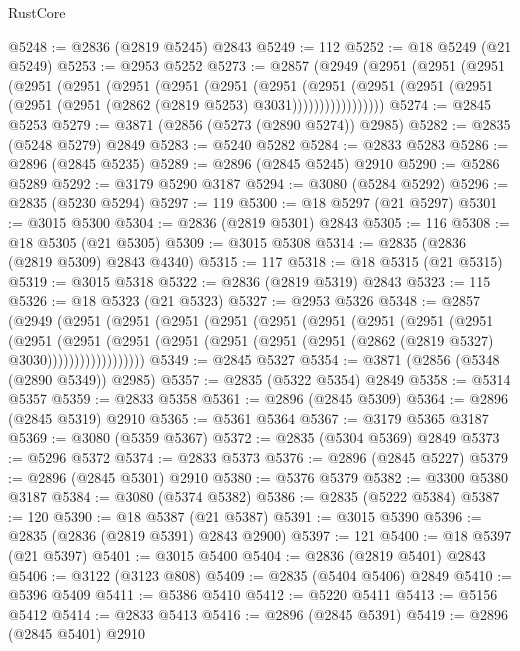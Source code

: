 \begin{lexlean}{RustCore}
\begin{coremodule}
@5248 := @2836 (@2819 @5245) @2843
@5249 := 112
@5252 := @18 @5249 (@21 @5249)
@5253 := @2953 @5252
@5273 := @2857
    (@2949
      (@2951
        (@2951
          (@2951
            (@2951
              (@2951
                (@2951
                  (@2951
                    (@2951
                      (@2951
                        (@2951
                          (@2951
                            (@2951 (@2951 (@2951 (@2951 (@2862 (@2819 @5253) @3031)))))))))))))))))
@5274 := @2845 @5253
@5279 := @3871 (@2856 (@5273 (@2890 @5274)) @2985)
@5282 := @2835 (@5248 @5279) @2849
@5283 := @5240 @5282
@5284 := @2833 @5283
@5286 := @2896 (@2845 @5235)
@5289 := @2896 (@2845 @5245) @2910
@5290 := @5286 @5289
@5292 := @3179 @5290 @3187
@5294 := @3080 (@5284 @5292)
@5296 := @2835 (@5230 @5294)
@5297 := 119
@5300 := @18 @5297 (@21 @5297)
@5301 := @3015 @5300
@5304 := @2836 (@2819 @5301) @2843
@5305 := 116
@5308 := @18 @5305 (@21 @5305)
@5309 := @3015 @5308
@5314 := @2835 (@2836 (@2819 @5309) @2843 @4340)
@5315 := 117
@5318 := @18 @5315 (@21 @5315)
@5319 := @3015 @5318
@5322 := @2836 (@2819 @5319) @2843
@5323 := 115
@5326 := @18 @5323 (@21 @5323)
@5327 := @2953 @5326
@5348 := @2857
    (@2949
      (@2951
        (@2951
          (@2951
            (@2951
              (@2951
                (@2951
                  (@2951
                    (@2951
                      (@2951
                        (@2951
                          (@2951
                            (@2951
                              (@2951
                                (@2951 (@2951 (@2951 (@2862 (@2819 @5327) @3030))))))))))))))))))
@5349 := @2845 @5327
@5354 := @3871 (@2856 (@5348 (@2890 @5349)) @2985)
@5357 := @2835 (@5322 @5354) @2849
@5358 := @5314 @5357
@5359 := @2833 @5358
@5361 := @2896 (@2845 @5309)
@5364 := @2896 (@2845 @5319) @2910
@5365 := @5361 @5364
@5367 := @3179 @5365 @3187
@5369 := @3080 (@5359 @5367)
@5372 := @2835 (@5304 @5369) @2849
@5373 := @5296 @5372
@5374 := @2833 @5373
@5376 := @2896 (@2845 @5227)
@5379 := @2896 (@2845 @5301) @2910
@5380 := @5376 @5379
@5382 := @3300 @5380 @3187
@5384 := @3080 (@5374 @5382)
@5386 := @2835 (@5222 @5384)
@5387 := 120
@5390 := @18 @5387 (@21 @5387)
@5391 := @3015 @5390
@5396 := @2835 (@2836 (@2819 @5391) @2843 @2900)
@5397 := 121
@5400 := @18 @5397 (@21 @5397)
@5401 := @3015 @5400
@5404 := @2836 (@2819 @5401) @2843
@5406 := @3122 (@3123 @808)
@5409 := @2835 (@5404 @5406) @2849
@5410 := @5396 @5409
@5411 := @5386 @5410
@5412 := @5220 @5411
@5413 := @5156 @5412
@5414 := @2833 @5413
@5416 := @2896 (@2845 @5391)
@5419 := @2896 (@2845 @5401) @2910

\end{coremodule}
\end{lexlean}
